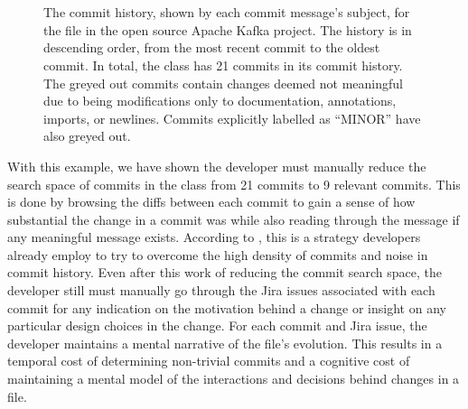 \begin{figure}
\begin{RaggedRight}
	\textcolor{gray}{} \\
	\textcolor{gray}{} \\
	\textcolor{gray}{} \\
	 \\
	 \\
	\textcolor{gray}{} \\
	 \\
	\caption{The commit history, shown by each commit message's subject, for the  file in the open source Apache Kafka project. 		The history is in descending order, from the most recent commit to the oldest commit.
		In total, the  class has 21 commits in its commit history. The greyed out commits contain changes deemed not meaningful due 		to being modifications only to documentation, annotations, imports, or newlines. Commits explicitly labelled as ``MINOR'' have also greyed 			out.}
	\label{fig:Topology-Commit-History}
\end{RaggedRight}
\end{figure}

With this example, we have shown the developer must manually reduce the search space of commits in the  class from 21 commits to 9 relevant commits. 
This is done by browsing the diffs between each commit to gain a sense of how substantial the change in a commit was while also reading through the message if any meaningful message exists.
According to \cite{codoban_software_2015}, this is a strategy developers already employ to try to overcome the high density of commits and noise in commit history. 
Even after this work of reducing the commit search space, the developer still must manually go through the Jira issues associated with each commit for any indication on the motivation behind a change or insight on any particular design choices in the change.
For each commit and Jira issue, the developer maintains a mental narrative of the file's evolution. 
This results in a temporal cost of determining non-trivial commits and a cognitive cost of maintaining a mental model of the interactions and decisions behind changes in a file.

